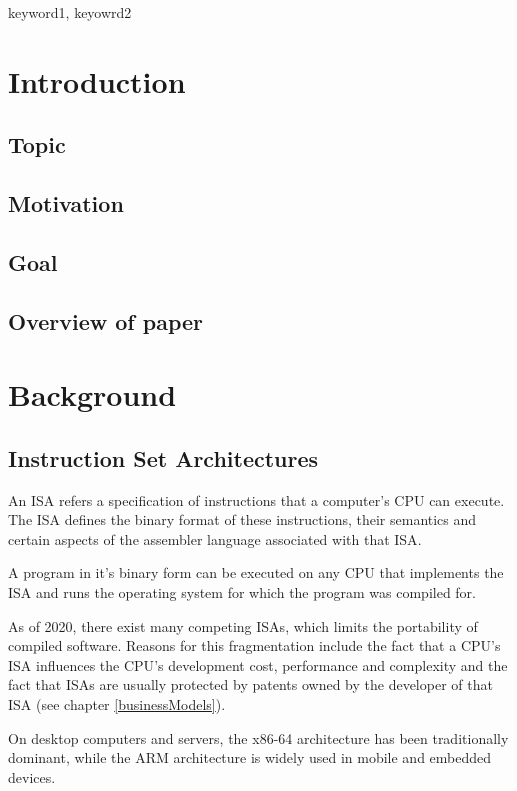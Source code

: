 \documentclass[conference]{IEEEtran}
\begin{document}
\begin{IEEEkeywords}
keyword1, keyowrd2
\end{IEEEkeywords}

\section{Introduction}
\label{ref:introduction}
	\subsection{Topic}
	\subsection{Motivation}
	\subsection{Goal}
	\subsection{Overview of paper}

\section{Background}
\label{ref:background}
	\subsection{Instruction Set Architectures}
	An \gls{ISA} refers a specification of instructions that a computer's \gls{CPU} can execute.
	The \gls{ISA} defines the binary format of these instructions, their semantics and certain aspects of the assembler
	language associated with that \gls{ISA}.

	A program in it's binary form can be executed on any \gls{CPU} that implements the \gls{ISA} and runs the operating system
	for which the program was compiled for.

	As of 2020, there exist many competing \glspl{ISA}, which limits the portability of compiled software.
	Reasons for this fragmentation include the fact that a \gls{CPU}'s \gls{ISA} influences the \gls{CPU}'s development cost, performance and complexity
	and the fact that \glspl{ISA} are usually protected by patents owned by the developer of that \gls{ISA} (see chapter \ref{businessModels}).

	On desktop computers and servers, the x86-64 architecture has been traditionally dominant,
	while the ARM architecture is widely used in mobile and embedded devices.
\end{document}
